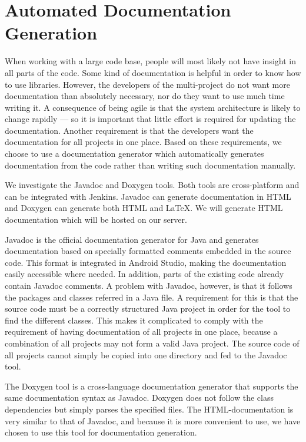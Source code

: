 \section{Automated Documentation Generation}\label{sec:automated_documentation_gen}
When working with a large code base, people will most likely not have insight in all parts of the code. Some kind of documentation is helpful in order to know how to use libraries. However, the developers of the multi-project do not want more documentation than absolutely necessary, nor do they want to use much time writing it. A consequence of being agile is that the system architecture is likely to change rapidly --- so it is important that little effort is required for updating the documentation. Another requirement is that the developers want the documentation for all projects in one place. Based on these requirements, we choose to use a documentation generator which automatically generates documentation from the code rather than writing such documentation manually.

We investigate the Javadoc \parencite{javadoc} and Doxygen \parencite{doxygen} tools. Both tools are cross-platform and can be integrated with Jenkins. Javadoc can generate documentation in HTML and Doxygen can generate both HTML and \LaTeX. We will generate HTML documentation which will be hosted on our server.

Javadoc is the official documentation generator for Java and generates documentation based on specially formatted comments embedded in the source code. This format is integrated in Android Studio, making the documentation easily accessible where needed. In addition, parts of the existing code already contain Javadoc comments. A problem with Javadoc, however, is that it follows the packages and classes referred in a Java file. A requirement for this is that the source code must be a correctly structured Java project in order for the tool to find the different classes. This makes it complicated to comply with the requirement of having documentation of all projects in one place, because a combination of all projects may not form a valid Java project. The source code of all projects cannot simply be copied into one directory and fed to the Javadoc tool.

The Doxygen tool is a cross-language documentation generator that supports the same documentation syntax as Javadoc. Doxygen does not follow the class dependencies but simply parses the specified files. The HTML-documentation is very similar to that of Javadoc, and because it is more convenient to use, we have chosen to use this tool for documentation generation.

